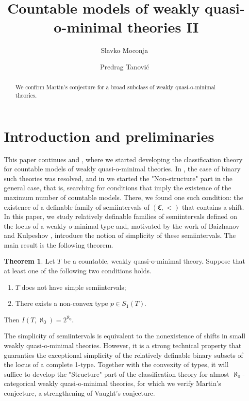 \documentclass{amsart}
\title{Countable models of weakly quasi-o-minimal theories II}
\author[S.\ Moconja]{Slavko Moconja\ \orcidlink{0000-0003-4095-8830}}
\author[P.\ Tanovi\'c]{Predrag Tanovi\'c\ \orcidlink{0000-0003-0307-7508}}
\theoremstyle{definition}
\theoremstyle{definition}
\newtheorem{Theorem1}{Theorem}
\newcommand{\Mon}{\mathfrak C}
\begin{document}
 

\begin{abstract} 
 We confirm Martin's conjecture for a broad subclass of weakly quasi-o-minimal theories. 
\end{abstract}



\maketitle


\section{Introduction and preliminaries}


This paper continues \cite{MT} and \cite{MTwqom1}, where we started developing the classification theory for countable models of weakly quasi-o-minimal theories.
In \cite{MT}, the case of binary such theories was resolved, and in \cite{MTwqom1} we started the "Non-structure" part in the general case, that is, searching for conditions that imply the existence of the maximum number of countable models. There, we found one such condition: the existence of a definable family of semiintervals of $(\Mon,<)$ that contains a shift. In this paper, we study relatively definable families of semiintervals defined on the locus of a weakly o-minimal type and, motivated by the work of Baizhanov and Kulpeshov \cite{Baizhanov2006}, introduce the notion of simplicity of these semiintervals. The main result is the following theorem.

\begin{Theorem1}\label{Theorem main}
Let $T$ be a countable, weakly quasi-o-minimal theory. Suppose that at least one of the following two conditions holds.
\begin{enumerate}[\hspace{10pt}(1)]
    \item $T$ does not have simple semiintervals;
    \item There exists a non-convex type $p\in S_1(T)$. 
\end{enumerate}
Then $I(T,\aleph_0)=2^{\aleph_0}$.
\end{Theorem1}


The simplicity of semiintervals is equivalent to the nonexistence of shifts in small weakly quasi-o-minimal theories. However, it is a strong technical property that guaranties the exceptional simplicity of the relatively definable binary subsets of the locus of a complete 1-type. Together with the convexity of types, it will suffice to develop the "Structure" part of the classification theory for almost $\aleph_0$-categorical weakly quasi-o-minimal theories, for which we verify Martin's conjecture, a strengthening of Vaught's conjecture. 
\end{document}
